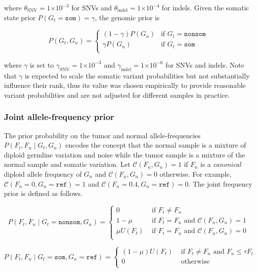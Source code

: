 \documentclass{article}
\newcommand{\e}[1]{\ensuremath{\times 10^{#1}}}
\begin{document}
\noindent where $\theta_{\text{SNV}}=1\e{-3}$ for SNVs and $\theta_{\text{indel}}=1\e{-4}$ for indels. Given the somatic state prior $P(G_t=\texttt{som}) = \gamma$, the genomic prior is

\begin{equation*}
P(G_t, G_n)=
\begin{cases}
	(1 - \gamma) P(G_n) & \text{if } G_t = \texttt{nonsom} \\
	\gamma P(G_n) & \text{if } G_t = \texttt{som} \\
\end{cases}
\end{equation*}

\noindent where $\gamma$ is set to $\gamma_{\text{SNV}} = 1\e{-3}$ and $\gamma_{\text{indel}} = 1\e{-6}$ for SNVs and indels. Note that $\gamma$ is expected to scale the somatic variant probabilities but not substantially influence their rank, thus its value was chosen empirically to provide reasonable variant probabilities and are not adjusted for different samples in practice.


\subsubsection{Joint allele-frequency prior}
The prior probability on the tumor and normal allele-frequencies $P(F_t, F_n \mid G_t, G_n)$ encodes the concept that the normal sample is a mixture of diploid germline variation and noise while the tumor sample is a mixture of the normal sample and somatic variation. Let $\mathcal{C} (F_n, G_n) = 1$ if $F_n$ is a {\em canonical} diploid allele frequency of $G_n$ and $\mathcal{C} (F_n, G_n) = 0$ otherwise. For example, $\mathcal{C} (F_n=0, G_n = \texttt{ref}) = 1$ and $\mathcal{C} (F_n=0.4, G_n = \texttt{ref}) = 0$. The joint frequency prior is defined as follows.

\begin{equation*}
P(F_t, F_n \mid G_t = \texttt{nonsom}, G_n)=
\begin{cases}
	0 & \text{ if } F_t \neq F_n \\
	1-\mu & \text{ if } F_t = F_n \text{ and }\mathcal{C}(F_n, G_n) = 1 \\
	\mu U(F_t) & \text{ if } F_t = F_n \text{ and }\mathcal{C}(F_n, G_n) = 0 \\
\end{cases}
\end{equation*}

\begin{equation*}
P(F_t, F_n \mid G_t = \texttt{som}, G_n = \texttt{ref})=
\begin{cases}
	(1-\mu)U(F_t) & \text{ if } F_t \neq F_n \text{ and } F_n \leq \tau F_t \\
	0 & \text{ otherwise } \\
\end{cases}
\end{equation*}
\end{document}
